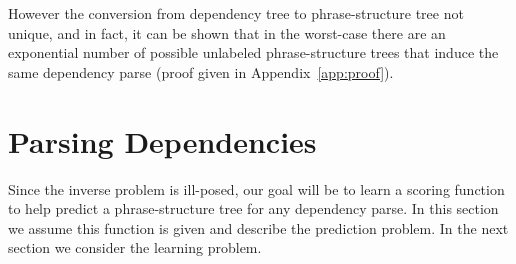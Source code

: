 \documentclass[11pt,letterpaper]{article}
\begin{document}



However the conversion from dependency tree to phrase-structure tree not unique, and in fact, it can be shown that in the worst-case there are an
exponential number of possible unlabeled phrase-structure trees that induce the same dependency parse (proof given in Appendix~\ref{app:proof}).


\section{Parsing Dependencies}

Since the inverse problem is ill-posed, our goal will
be to learn a scoring function to help predict a
phrase-structure tree for any dependency parse. In
this section we assume this function is given and describe
the prediction problem. In the next section we consider
the learning problem.





\end{document}

